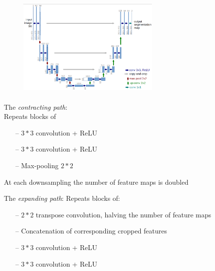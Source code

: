 \begin{figure}
    \includegraphics[width=7cm, height=5cm]{images/u_net.png}
\end{figure}  

The \textit{contracting path}:\\
Repeats blocks of 
\begin{itemize}
    \item[--] $3*3$ convolution + ReLU
    \item[--] $3*3$ convolution + ReLU
    \item[--] Max-pooling $2*2$
\end{itemize}{}
At each downsampling the number of feature maps is doubled

The \textit{expanding path}:
Repeats blocks of:
\begin{itemize}
    \item[--] $2*2$ transpose convolution, halving the number of feature maps
    \item[--] Concatenation of corresponding cropped features
    \item[--] $3*3$ convolution + ReLU
    \item[--] $3*3$ convolution + ReLU
\end{itemize}{}

